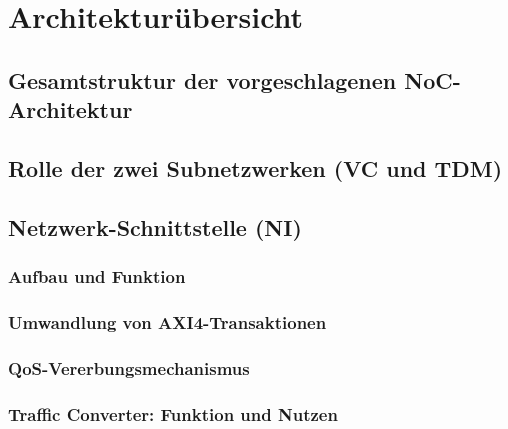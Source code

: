 \chapter{Architekturübersicht}

\section{Gesamtstruktur der vorgeschlagenen NoC-Architektur}

\section{Rolle der zwei Subnetzwerken (VC und TDM)}

\section{Netzwerk-Schnittstelle (NI)}
\subsection{Aufbau und Funktion}
\subsection{Umwandlung von AXI4-Transaktionen}
\subsection{QoS-Vererbungsmechanismus}
\subsection{Traffic Converter: Funktion und Nutzen}
